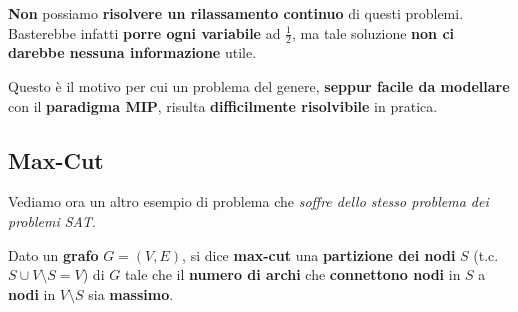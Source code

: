 \begin{remark}
    \textbf{Non} possiamo \textbf{risolvere un rilassamento continuo} di questi
    problemi. Basterebbe infatti \textbf{porre ogni variabile} ad $\frac{1}{2}$,
    ma tale soluzione \textbf{non ci darebbe nessuna informazione} utile.
\end{remark}

Questo è il motivo per cui un problema del genere, \textbf{seppur facile da modellare}
con il \textbf{paradigma MIP}, risulta \textbf{difficilmente risolvibile} in pratica.

\subsection{Max-Cut}

Vediamo ora un altro esempio di problema che \textit{soffre dello stesso problema
dei problemi SAT}.

\begin{definition}
    Dato un \textbf{grafo} $G=(V,E)$, si dice \textbf{max-cut}
    una \textbf{partizione dei nodi} $S$ (t.c. $S \cup V\setminus S = V$) 
    di $G$ tale che il \textbf{numero di archi} che 
    \textbf{connettono nodi} in $S$ a \textbf{nodi} in $V\setminus S$
    sia \textbf{massimo}.
\end{definition}

